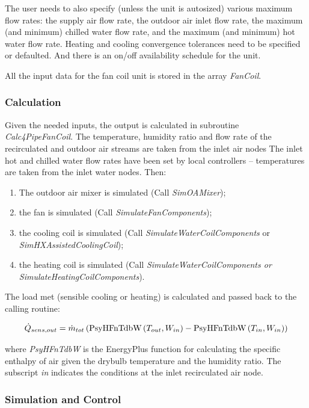The user needs to also specify (unless the unit is autosized) various maximum flow rates: the supply air flow rate, the outdoor air inlet flow rate, the maximum (and minimum) chilled water flow rate, and the maximum (and minimum) hot water flow rate. Heating and cooling convergence tolerances need to be specified or defaulted. And there is an on/off availability schedule for the unit.

All the input data for the fan coil unit is stored in the array \emph{FanCoil}.

\subsubsection{Calculation}\label{calculation-3-000}

Given the needed inputs, the output is calculated in subroutine \emph{Calc4PipeFanCoil}. The temperature, humidity ratio and flow rate of the recirculated and outdoor air streams are taken from the inlet air nodes The inlet hot and chilled water flow rates have been set by local controllers -- temperatures are taken from the inlet water nodes. Then:

\begin{enumerate}
\item The outdoor air mixer is simulated (Call \emph{SimOAMixer});
\item the fan is simulated (Call \emph{SimulateFanComponents});
\item the cooling coil is simulated (Call \emph{SimulateWaterCoilComponents} or \emph{SimHXAssistedCoolingCoil});
\item the heating coil is simulated (Call \emph{SimulateWaterCoilComponents or SimulateHeatingCoilComponents}).
\end{enumerate}

The load met (sensible cooling or heating) is calculated and passed back to the calling routine:

\begin{equation}
  \dot{Q}_{sens,out} = \dot{m}_{tot} \left(\text{PsyHFnTdbW}\left(T_{out},W_{in}\right) - \text{PsyHFnTdbW}\left(T_{in},W_{in}\right)\right)
\end{equation}

where \emph{PsyHFnTdbW} is the EnergyPlus function for calculating the specific enthalpy of air given the drybulb temperature and the humidity ratio. The subscript \emph{in} indicates the conditions at the inlet recirculated air node.

\subsubsection{Simulation and Control}\label{simulation-and-control-3-000}

